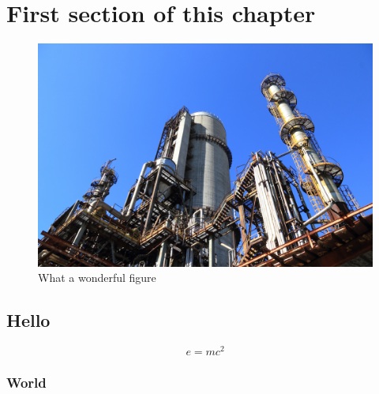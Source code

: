 \section{First section of this chapter}

\begin{figure}[h]
    \includegraphics[width=\linewidth]{figures/sample.jpg}
    \caption{What a wonderful figure}
    \label{fig:sample}
\end{figure}

\subsection{Hello}

\begin{equation}
    e=mc^2
\end{equation}

\cite{booth_nitro_2000}

\subsubsection{World}

